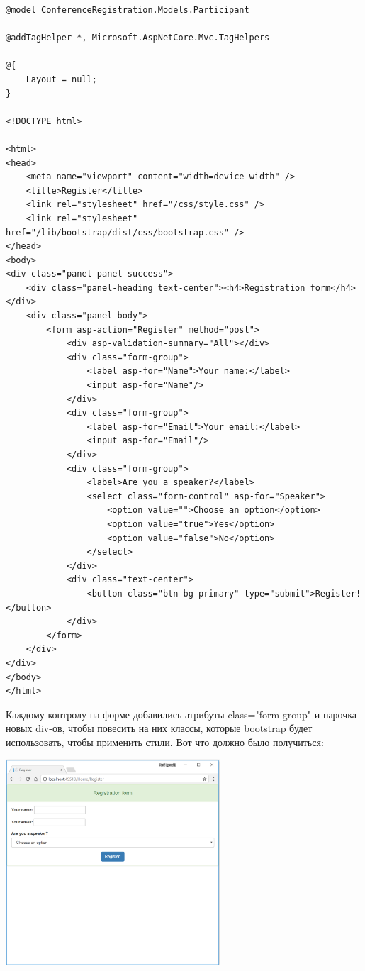\documentclass[a5paper]{article}
\begin{document}
\begin{verbatim}
@model ConferenceRegistration.Models.Participant

@addTagHelper *, Microsoft.AspNetCore.Mvc.TagHelpers

@{
    Layout = null;
}

<!DOCTYPE html>

<html>
<head>
    <meta name="viewport" content="width=device-width" />
    <title>Register</title>
    <link rel="stylesheet" href="/css/style.css" />
    <link rel="stylesheet" href="/lib/bootstrap/dist/css/bootstrap.css" />
</head>
<body>
<div class="panel panel-success">
    <div class="panel-heading text-center"><h4>Registration form</h4></div>
    <div class="panel-body">
        <form asp-action="Register" method="post">
            <div asp-validation-summary="All"></div>
            <div class="form-group">
                <label asp-for="Name">Your name:</label>
                <input asp-for="Name"/>
            </div>
            <div class="form-group">
                <label asp-for="Email">Your email:</label>
                <input asp-for="Email"/>
            </div>
            <div class="form-group">
                <label>Are you a speaker?</label>
                <select class="form-control" asp-for="Speaker">
                    <option value="">Choose an option</option>
                    <option value="true">Yes</option>
                    <option value="false">No</option>
                </select>
            </div>
            <div class="text-center">
                <button class="btn bg-primary" type="submit">Register!</button>
            </div>
        </form>
    </div>
</div>
</body>
</html>
\end{verbatim}

Каждому контролу на форме добавились атрибуты class="form-group" и парочка новых div-ов, чтобы повесить на них классы, которые bootstrap будет использовать, чтобы применить стили. Вот что должно было получиться:

\begin{center}
	\includegraphics[width=0.6\textwidth]{styledRegisterForm.png}
\end{center}
\end{document}
